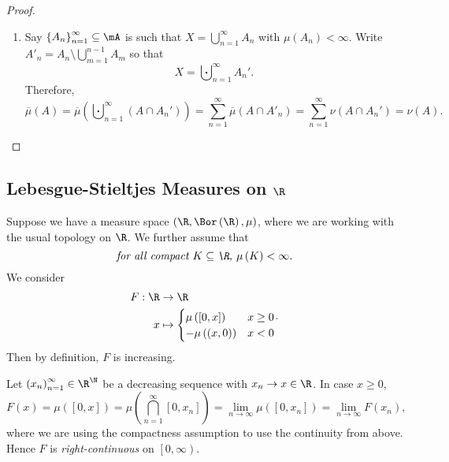 \documentclass[pmath451]{subfiles}
\begin{document}
\begin{proof}
\begin{enumerate}
            \item Say $\left\lbrace A_n \right\rbrace^{\infty}_{n=1}\subseteq\mA$ is such that $X=\bigcup^{\infty}_{n=1} A_n$ with $\mu\left( A_n \right) < \infty$. Write $A'_n = A_n\setminus\bigcup^{n-1}_{m=1} A_m$ so that
                \begin{equation*}
                    X = \bigcupdot^{\infty}_{n=1} A_n' .
                \end{equation*}
                Therefore,
                \begin{equation*}
                    \overline{\mu}\left( A \right) = \overline{\mu}\left( \bigcupdot^{\infty}_{n=1} \left( A\cap A_n' \right) \right) = \sum^{\infty}_{n=1} \overline{\mu}\left( A\cap A'_n \right) = \sum^{\infty}_{n=1} \nu\left( A\cap A_n' \right) = \nu\left( A \right).
                \end{equation*}
        \end{enumerate}
    \end{proof}

    \subsection{Lebesgue-Stieltjes Measures on $\R$}
    
    Suppose we have a measure space $\left( \R,\Bor\left( \R \right),\mu \right)$, where we are working with the usual topology on $\R$. We further assume that
    \begin{equation*}
        \text{\textit{for all compact $K\subseteq\R$, $\mu\left( K \right) < \infty$.}}
    \end{equation*}
    We consider
    \begin{equation*}
        \begin{aligned}
            F:\R&\to\R \\
            x&\mapsto
            \begin{cases} 
                \mu\left( \left[ 0,x \right] \right) & x\geq 0 \\
                -\mu\left( \left( x,0 \right) \right) & x < 0
            \end{cases}
        \end{aligned} .
    \end{equation*}
    Then by definition, $F$ is increasing.

    Let $\left( x_{n} \right)^{\infty}_{n=1}\in\R^{\N}$ be a decreasing sequence with $x_n\to x\in\R$. In case $x\geq 0$,
    \begin{equation*}
        F\left( x \right) = \mu\left( \left[ 0,x \right] \right) = \mu\left( \bigcap^{\infty}_{n=1}\left[ 0,x_n \right] \right) = \lim_{n\to\infty} \mu\left( \left[ 0,x_n \right] \right) = \lim_{n\to\infty} F\left( x_n \right),
    \end{equation*}
    where we are using the compactness assumption to use the continuity from above. Hence $F$ is \emph{right-continuous} on $\left[ 0,\infty \right)$.
\end{document}

